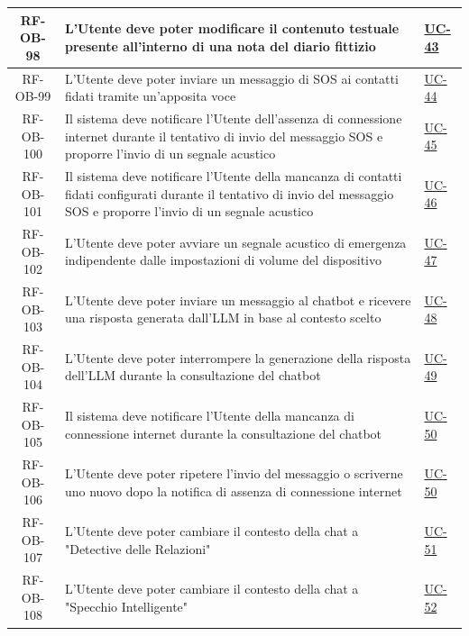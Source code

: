 \documentclass[a4paper,12pt]{article}
\begin{document}
\begin{center}
\begin{longtable}{|c|p{8.5cm}|>{\centering\arraybackslash}p{4cm}|}
RF-OB-98 & L'Utente deve poter modificare il contenuto testuale presente all'interno di una nota del diario fittizio & \hyperref[subsec:UC-43]{UC-43} \\
\hline

RF-OB-99 & L'Utente deve poter inviare un messaggio di SOS ai contatti fidati tramite un'apposita voce & \hyperref[sec:UC-44]{UC-44} \\
\hline

RF-OB-100 & Il sistema deve notificare l'Utente dell'assenza di connessione internet durante il tentativo di invio del messaggio SOS e proporre l'invio di un segnale acustico & \hyperref[sec:UC-45]{UC-45} \\
\hline

RF-OB-101 & Il sistema deve notificare l'Utente della mancanza di contatti fidati configurati durante il tentativo di invio del messaggio SOS e proporre l'invio di un segnale acustico & \hyperref[sec:UC-46]{UC-46} \\
\hline

RF-OB-102 & L'Utente deve poter avviare un segnale acustico di emergenza indipendente dalle impostazioni di volume del dispositivo & \hyperref[sec:UC-47]{UC-47} \\
\hline

RF-OB-103 & L'Utente deve poter inviare un messaggio al chatbot e ricevere una risposta generata dall'LLM in base al contesto scelto & \hyperref[sec:UC-48]{UC-48} \\
\hline

RF-OB-104 & L'Utente deve poter interrompere la generazione della risposta dell'LLM durante la consultazione del chatbot & \hyperref[sec:UC-49]{UC-49} \\
\hline

RF-OB-105 & Il sistema deve notificare l'Utente della mancanza di connessione internet durante la consultazione del chatbot & \hyperref[sec:UC-50]{UC-50} \\
\hline

RF-OB-106 & L'Utente deve poter ripetere l'invio del messaggio o scriverne uno nuovo dopo la notifica di assenza di connessione internet & \hyperref[sec:UC-50]{UC-50} \\
\hline

RF-OB-107 & L'Utente deve poter cambiare il contesto della chat a "Detective delle Relazioni" & \hyperref[sec:UC-51]{UC-51} \\
\hline

RF-OB-108 & L'Utente deve poter cambiare il contesto della chat a "Specchio Intelligente" & \hyperref[sec:UC-52]{UC-52} \\
\hline


\end{longtable}
\end{center}
\end{document}
